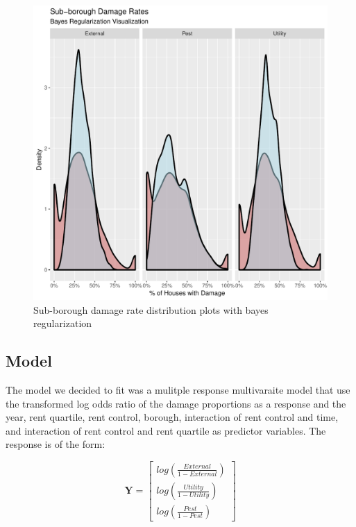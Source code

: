\documentclass[11pt]{asaproc}\usepackage[]{graphicx}\usepackage[]{color}
\makeatletter
\def\maxwidth{ %
  \ifdim\Gin@nat@width>\linewidth
    \linewidth
  \else
    \Gin@nat@width
  \fi
}
\newenvironment{knitrout}{}{} %
\makeatother
\begin{document}
\begin{figure}
\begin{center}
\begin{knitrout}
\color{fgcolor}
\includegraphics[width=\maxwidth]{figure/fig3-1} 

\end{knitrout}
\end{center}
\caption{Sub-borough damage rate distribution plots with bayes regularization}
\label{fig:three}
\end{figure}

\subsection{Model}
The model we decided to fit was a mulitple response multivaraite model that use the transformed log odds ratio of the damage proportions as a response and the year, rent quartile, rent control, borough, interaction of rent control and time, and interaction of rent control and rent quartile as predictor variables. The response is of the form:

\[
\mathbf{Y} = 
\left[
\begin{matrix} 
log\left(\frac{External}{1-External}\right)\\
log\left(\frac{Utility}{1-Utility}\right) \\
log\left(\frac{Pest}{1-Pest}\right) 
\end{matrix}
\right]
\]
\end{document}
